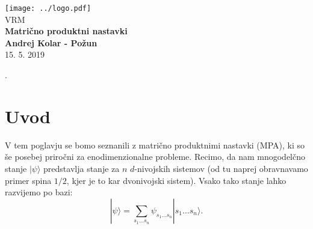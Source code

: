 \documentclass{article}
\begin{document}
\begin{titlepage}
    \begin{center}
        \vspace*{1cm}
        \Large
\texttt{[image: ../logo.pdf]}\\
        \Large
\vspace{1cm}
        VRM\\
        \huge
        \textbf{Matrično produktni nastavki\\}
\Large  
        \vspace{1cm}
        \textbf{Andrej Kolar - Po{\v z}un\\}
        \vspace{0.8cm}
 15. 5. 2019

\vfill
\normalsize
\end{center}. 
\end{titlepage}
\newpage
{}
\section*{Uvod}

V tem poglavju se bomo seznanili z matrično produktnimi nastavki (MPA), ki so še posebej priročni za enodimenzionalne probleme.
Recimo, da nam mnogodelčno stanje $| \psi \rangle$ predstavlja stanje za $n$ $d$-nivojskih sistemov (od tu naprej obravnavamo primer spina $1/2$, kjer je to kar dvonivojski sistem). Vsako tako stanje lahko razvijemo po bazi:
\begin{equation*}
|\psi \rangle = \sum_{s_1 \dots s_n} \psi_{s_1 \dots s_n} |s_1 \dots s_n \rangle.
\end{equation*}
\end{document}
